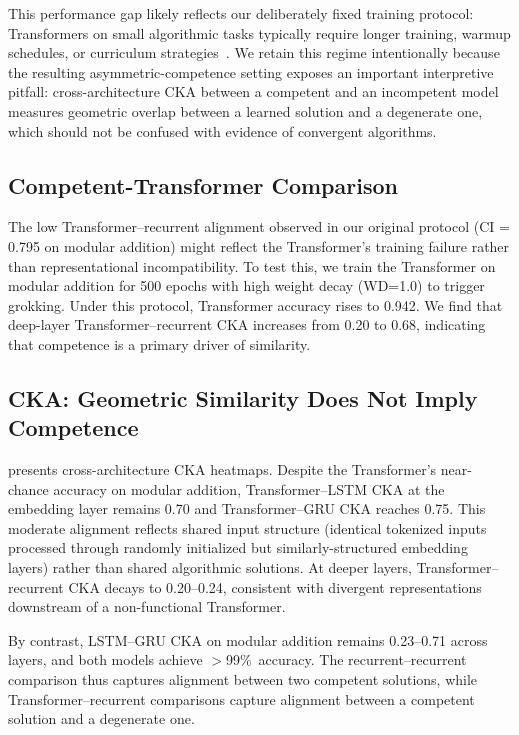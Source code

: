 \documentclass{article}
\begin{document}
This performance gap likely reflects our deliberately fixed 
training protocol: Transformers on small algorithmic tasks 
typically require longer training, warmup schedules, or 
curriculum strategies~\citep{nanda2023grokking}. We retain this 
regime intentionally because the resulting 
asymmetric-competence setting exposes an important interpretive 
pitfall: cross-architecture CKA between a competent and an 
incompetent model measures geometric overlap between a learned 
solution and a degenerate one, which should not be confused with 
evidence of convergent algorithms.

\subsection{Competent-Transformer Comparison}
\label{sec:grokking}

The low Transformer--recurrent alignment observed in our 
original protocol (CI = 0.795 on modular addition) might 
reflect the Transformer's training failure rather than 
representational incompatibility. To test this, we train the 
Transformer on modular addition for 500 epochs with high weight 
decay (WD=1.0) to trigger grokking. Under this protocol, 
Transformer accuracy rises to 0.942. We find that deep-layer 
Transformer--recurrent CKA increases from 0.20 to 0.68, indicating that 
competence is a primary driver of similarity.

\subsection{CKA: Geometric Similarity Does Not Imply Competence}
\label{sec:cka_results}

 presents cross-architecture CKA heatmaps. 
Despite the Transformer's near-chance accuracy on modular 
addition, Transformer--LSTM CKA at the embedding layer remains 
0.70 and Transformer--GRU CKA reaches 0.75. This moderate 
alignment reflects shared input structure (identical tokenized 
inputs processed through randomly initialized but 
similarly-structured embedding layers) rather than shared 
algorithmic solutions. At deeper layers, Transformer--recurrent 
CKA decays to 0.20--0.24, consistent with divergent 
representations downstream of a non-functional Transformer.

By contrast, LSTM--GRU CKA on modular addition remains 
0.23--0.71 across layers, and both models achieve 
$>$99\%~accuracy. The recurrent--recurrent comparison thus 
captures alignment between two competent solutions, while 
Transformer--recurrent comparisons capture alignment between a 
competent solution and a degenerate one.
\end{document}
